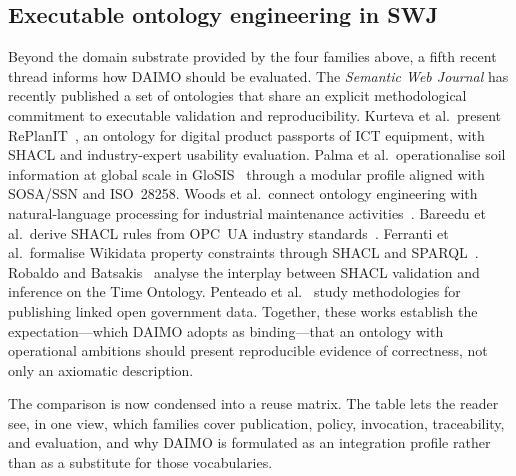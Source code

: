 \documentclass[Afour,sagev,times]{sagej}
\begin{document}
\subsection{Executable ontology engineering in SWJ}

Beyond the domain substrate provided by the four families above, a fifth recent thread informs how DAIMO should be evaluated. The \emph{Semantic Web Journal} has recently published a set of ontologies that share an explicit methodological commitment to executable validation and reproducibility. Kurteva et al.\ present RePlanIT~\cite{kurteva}, an ontology for digital product passports of ICT equipment, with SHACL and industry-expert usability evaluation. Palma et al.\ operationalise soil information at global scale in GloSIS~\cite{palma} through a modular profile aligned with SOSA/SSN and ISO~28258. Woods et al.\ connect ontology engineering with natural-language processing for industrial maintenance activities~\cite{woods}. Bareedu et al.\ derive SHACL rules from OPC~UA industry standards~\cite{bareedu24}. Ferranti et al.\ formalise Wikidata property constraints through SHACL and SPARQL~\cite{ferranti}. Robaldo and Batsakis~\cite{robaldo} analyse the interplay between SHACL validation and inference on the Time Ontology. Penteado et al.~\cite{penteado23} study methodologies for publishing linked open government data. Together, these works establish the expectation---which DAIMO adopts as binding---that an ontology with operational ambitions should present reproducible evidence of correctness, not only an axiomatic description.

The comparison is now condensed into a reuse matrix. The table lets the reader see, in one view, which families cover publication, policy, invocation, traceability, and evaluation, and why DAIMO is formulated as an integration profile rather than as a substitute for those vocabularies.
\end{document}
